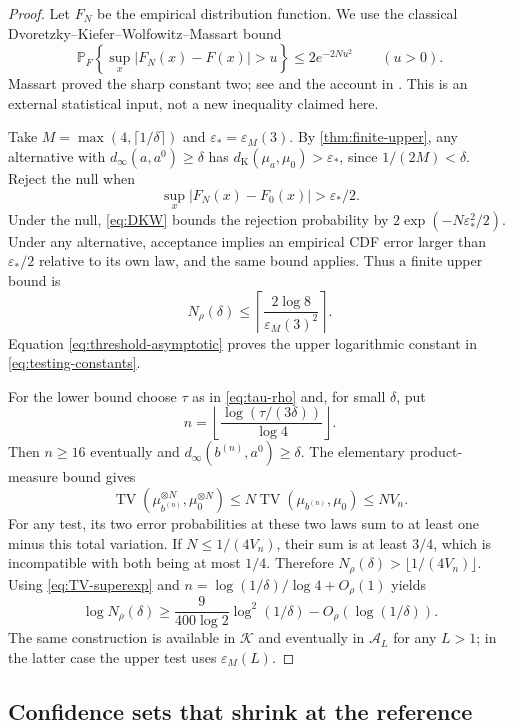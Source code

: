 \documentclass[11pt,a4paper]{article}
\numberwithin{equation}{section}
\theoremstyle{definition}
\theoremstyle{remark}
\DeclareMathOperator{\TV}{TV}
\newcommand{\PP}{\mathbb P}
\newcommand{\A}{\mathcal A}
\newcommand{\K}{\mathcal K}
\newcommand{\eps}{\varepsilon}
\newcommand{\distK}{d_{\mathrm K}}
\begin{document}
\begin{proof}
Let $F_N$ be the empirical distribution function. We use the classical
Dvoretzky--Kiefer--Wolfowitz--Massart bound
\begin{equation}
 \PP_F\!\left\{\sup_x|F_N(x)-F(x)|>u\right\}
 \le2e^{-2Nu^2}\qquad(u>0).
 \label{eq:DKW}
\end{equation}
Massart proved the sharp constant two; see \cite{massart} and the account
in \cite{weidudley}. This is an external statistical input, not a new
inequality claimed here.

Take $M=\max(4,\lceil1/\delta\rceil)$ and
$\eps_*=\eps_M(3)$. By \cref{thm:finite-upper}, any alternative with
$d_\infty(a,a^0)\ge\delta$ has
$\distK(\mu_a,\mu_0)>\eps_*$, since $1/(2M)<\delta$.
Reject the null when
\begin{equation}
 \sup_x|F_N(x)-F_0(x)|>\eps_*/2.
 \label{eq:cdf-test}
\end{equation}
Under the null, \eqref{eq:DKW} bounds the rejection probability by
$2\exp(-N\eps_*^2/2)$. Under any alternative, acceptance implies an empirical
CDF error larger than $\eps_*/2$ relative to its own law, and the same bound
applies. Thus a finite upper bound is
\begin{equation}
 N_\rho(\delta)\le
 \left\lceil\frac{2\log8}{\eps_M(3)^2}\right\rceil.
 \label{eq:N-upper}
\end{equation}
Equation \eqref{eq:threshold-asymptotic} proves the upper logarithmic
constant in \eqref{eq:testing-constants}.

For the lower bound choose $\tau$ as in \eqref{eq:tau-rho} and, for small
$\delta$, put
\[
 n=\left\lfloor\frac{\log(\tau/(3\delta))}{\log4}\right\rfloor.
\]
Then $n\ge16$ eventually and $d_\infty(b^{(n)},a^0)\ge\delta$.
The elementary product-measure bound gives
\[
 \TV(\mu_{b^{(n)}}^{\otimes N},\mu_0^{\otimes N})
 \le N\TV(\mu_{b^{(n)}},\mu_0)\le NV_n.
\]
For any test, its two error probabilities at these two laws sum to at least
one minus this total variation. If $N\le1/(4V_n)$, their sum is at least
$3/4$, which is incompatible with both being at most $1/4$.
Therefore $N_\rho(\delta)>\lfloor1/(4V_n)\rfloor$.
Using \eqref{eq:TV-superexp} and
$n=\log(1/\delta)/\log4+O_\rho(1)$ yields
\[
 \log N_\rho(\delta)
 \ge\frac{9}{400\log2}\log^2(1/\delta)-O_\rho(\log(1/\delta)).
\]
The same construction is available in $\K$ and eventually in $\A_L$ for
any $L>1$; in the latter case the upper test uses $\eps_M(L)$.
\end{proof}

\subsection{Confidence sets that shrink at the reference}
\end{document}
